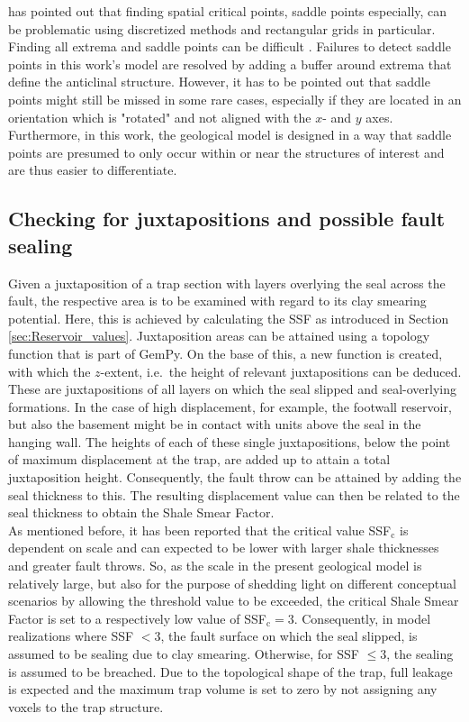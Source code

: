 			\citet{kuijper2004detecting} has pointed out that finding spatial critical points, saddle points especially, can be problematic using discretized methods and rectangular grids in particular. Finding all extrema and saddle points can be difficult \citep{kuijper2004detecting}. Failures to detect saddle points in this work's model are resolved by adding a buffer around extrema that define the anticlinal structure. However, it has to be pointed out that saddle points might still be missed in some rare cases, especially if they are located in an orientation which is "rotated" and not aligned with the $x$- and $y$ axes. Furthermore, in this work, the geological model is designed in a way that saddle points are presumed to only occur within or near the structures of interest and are thus easier to differentiate.
						
			\subsection{Checking for juxtapositions and possible fault sealing}\label{sec:check_juxta}
			Given a juxtaposition of a trap section with layers overlying the seal across the fault, the respective area is to be examined with regard to its clay smearing potential. Here, this is achieved by calculating the SSF as introduced in Section \ref{sec:Reservoir_values}. Juxtaposition areas can be attained using a topology function that is part of GemPy. On the base of this, a new function is created, with which the $z$-extent, i.e.\ the height of relevant juxtapositions can be deduced. These are juxtapositions of all layers on which the seal slipped and seal-overlying formations. In the case of high displacement, for example, the footwall reservoir, but also the basement might be in contact with units above the seal in the hanging wall. The  heights of each of these single juxtapositions, below the point of maximum displacement at the trap, are added up to attain a total juxtaposition height. Consequently, the fault throw can be attained by adding the seal thickness to this. The resulting displacement value can then be related to the seal thickness to obtain the Shale Smear Factor.\\
			As mentioned before, it has been reported that the critical value SSF$_\text{c}$ is dependent on scale and can expected to be lower with larger shale thicknesses and greater fault throws. So, as the scale in the present geological model is relatively large, but also for the purpose of shedding light on different conceptual scenarios by allowing the threshold value to be exceeded, the critical Shale Smear Factor is set to a respectively low value of SSF$_\text{c} = 3$. Consequently, in model realizations where SSF $< 3$, the fault surface on which the seal slipped, is assumed to be sealing due to clay smearing. Otherwise, for SSF $\le 3$, the sealing is assumed to be breached. Due to the topological shape of the trap, full leakage is expected and the maximum trap volume is set to zero by not assigning any voxels to the trap structure.
						
